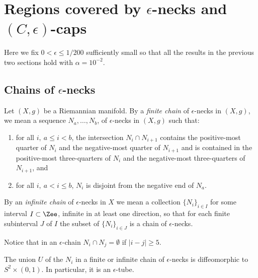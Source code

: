 \section{Regions covered by $\epsilon$-necks and
$(C,\epsilon)$-caps}


Here we fix $0<\epsilon\le 1/200$ sufficiently small so that all the
results in the previous two sections hold with $\alpha=10^{-2}$.

\subsection{Chains of $\epsilon$-necks}

\begin{definition}
\label{def:chain-of-epsilon-necks}
Let $(X,g)$ be a Riemannian manifold. By a {\em finite chain} of
$\epsilon$-necks in $(X,g)$, we mean a sequence $N_a,\ldots,N_{b}$,
of $\epsilon$-necks in $(X,g)$ such that: \begin{enumerate} \item
for all $i,\ a\le i<b$, the intersection $N_i\cap N_{i+1}$ contains
the positive-most quarter of $N_i$ and the negative-most quarter of
$N_{i+1}$ and is contained in the positive-most three-quarters of
$N_i$ and the negative-most three-quarters of $N_{i+1}$, and
\item  for all $i,\ a<i\le b$, $N_i$ is disjoint from the negative end of
$N_a$.
\end{enumerate}
By an {\em infinite chain} of $\epsilon$-necks in $X$ we mean a
collection $\{N_i\}_{i\in I}$ for some interval $I\subset \Zee$,
infinite in at least one direction, so that for each finite
subinterval $J$ of $I$ the subset of $\{N_i\}_{i\in J}$ is a chain
of $\epsilon$-necks.
\end{definition}




Notice that in an $\epsilon$-chain $N_i\cap N_j=\emptyset$ if
$|i-j|\ge 5$.


\begin{lemma}
\label{lem:chain-union-diffeomorphic-cylinder}
\label{S2timesI}
The union $U$ of the $N_i$ in a finite or infinite chain of
$\epsilon$-necks is diffeomorphic to $S^2\times (0,1)$. In
particular, it is an $\epsilon$-tube.
\end{lemma}

